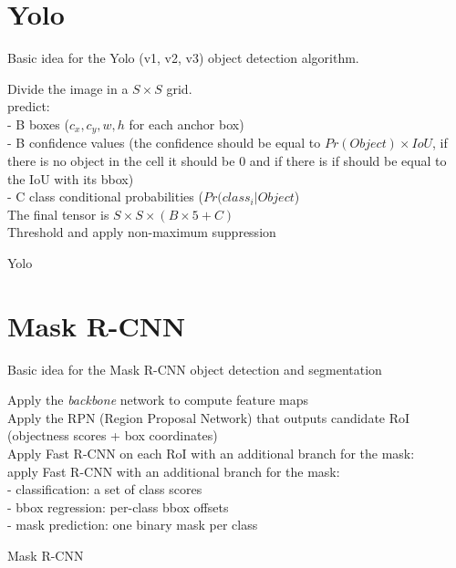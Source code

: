 \section{Yolo}
Basic idea for the Yolo (v1, v2, v3) object detection algorithm.

\begin{algorithm}[H]
\DontPrintSemicolon
{}
 Divide the image in a $S\times S$ grid. \\
  { predict: \\
  - B boxes ($c_x, c_y, w, h$ for each anchor box) \\
  - B confidence values (the confidence should be equal to $Pr(Object) \times IoU$, if there is no object in the cell it should be 0 and if there is if should be equal to the IoU with its bbox) \\
  - C class conditional probabilities ($Pr(class_i|Object$) \\}
 The final tensor is $S\times S \times (B \times 5 + C)$ \\
 Threshold and apply non-maximum suppression
\caption{Yolo}
\end{algorithm}


\section{Mask R-CNN}
Basic idea for the Mask R-CNN object detection and segmentation

\begin{algorithm}[H]
\DontPrintSemicolon
{}
 Apply the \textit{backbone} network to compute feature maps \\
 Apply the RPN (Region Proposal Network) that outputs candidate RoI (objectness scores + box coordinates) \\
 Apply Fast R-CNN on each RoI with an additional branch for the mask:\\
 {
  apply Fast R-CNN with an additional branch for the mask: \\
 - classification: a set of class scores  \\
 - bbox regression: per-class bbox offsets \\
 - mask prediction: one binary mask per class 
 }
 \caption{Mask R-CNN}
\end{algorithm}

